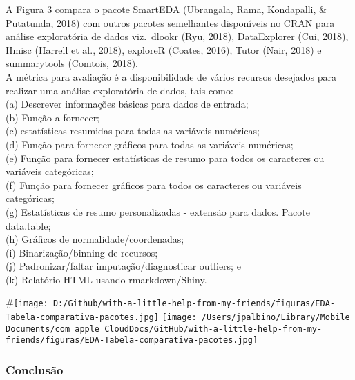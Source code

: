 \documentclass[
]{article}
\begin{document}
A Figura 3 compara o pacote SmartEDA (Ubrangala, Rama, Kondapalli, \&
Putatunda, 2018) com outros pacotes semelhantes disponíveis no CRAN para
análise exploratória de dados viz.~dlookr (Ryu, 2018), DataExplorer
(Cui, 2018), Hmisc (Harrell et al., 2018), exploreR (Coates, 2016),
Tutor (Nair, 2018) e summarytools (Comtois, 2018).\\
A métrica para avaliação é a disponibilidade de vários recursos
desejados para realizar uma análise exploratória de dados, tais como:\\
(a) Descrever informações básicas para dados de entrada;\\
(b) Função a fornecer;\\
(c) estatísticas resumidas para todas as variáveis numéricas;\\
(d) Função para fornecer gráficos para todas as variáveis numéricas;\\
(e) Função para fornecer estatísticas de resumo para todos os caracteres
ou variáveis categóricas;\\
(f) Função para fornecer gráficos para todos os caracteres ou variáveis
categóricas;\\
(g) Estatísticas de resumo personalizadas - extensão para dados. Pacote
data.table;\\
(h) Gráficos de normalidade/coordenadas;\\
(i) Binarização/binning de recursos;\\
(j) Padronizar/faltar imputação/diagnosticar outliers; e\\
(k) Relatório HTML usando rmarkdown/Shiny.

\#\texttt{[image: D:/Github/with-a-little-help-from-my-friends/figuras/EDA-Tabela-comparativa-pacotes.jpg]}
\texttt{[image: /Users/jpalbino/Library/Mobile Documents/com~apple~CloudDocs/GitHub/with-a-little-help-from-my-friends/figuras/EDA-Tabela-comparativa-pacotes.jpg]}

\hypertarget{conclusuxe3o}{%
\subsubsection{Conclusão}\label{conclusuxe3o}}
\end{document}
